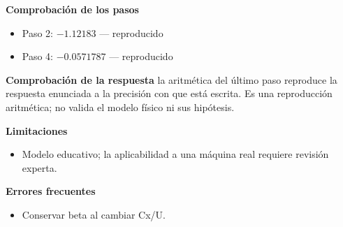 \documentclass[10pt,openany]{book}
\begin{document}
\begin{tcolorbox}[title={Problema resuelto 1}, studiumworked, breakable]
\noindent\textbf{Comprobación de los pasos}
\begin{itemize}
\item Paso 2: $-1.12183$ — reproducido
\item Paso 4: $-0.0571787$ — reproducido
\end{itemize}

\noindent\textbf{Comprobación de la respuesta} la aritmética del último paso reproduce la respuesta enunciada a la precisión con que está escrita. Es una reproducción aritmética; no valida el modelo físico ni sus hipótesis.

\noindent\textbf{Limitaciones}
\begin{itemize}
\item Modelo educativo; la aplicabilidad a una máquina real requiere revisión experta.
\end{itemize}

\noindent\textbf{Errores frecuentes}
\begin{itemize}
\item Conservar beta al cambiar Cx/U.
\end{itemize}
\end{tcolorbox}
\end{document}
